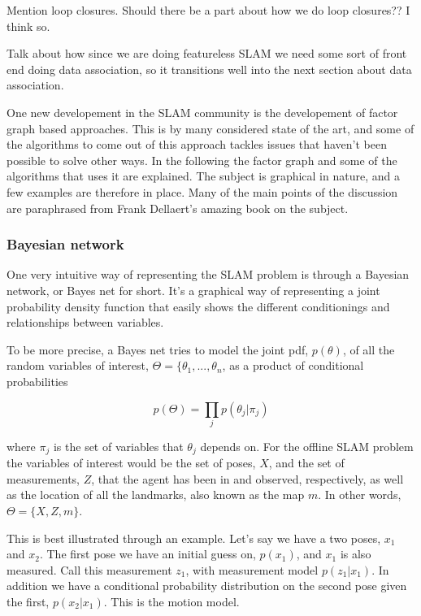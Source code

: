 Mention loop closures. Should there be a part about how we do loop closures?? I think so. 

Talk about how since we are doing featureless SLAM we need some sort of front end doing data association, so it transitions well into the next section about data association.

One new developement in the SLAM community is the developement of factor graph based approaches. This is by many considered state of the art, and some of the algorithms to come out of this approach tackles issues that haven't been possible to solve other ways. In the following the factor graph and some of the algorithms that uses it are explained. The subject is graphical in nature, and a few examples are therefore in place. Many of the main points of the discussion are paraphrased from Frank Dellaert's amazing book on the subject\cite{Dellaert}. 

\subsubsection{Bayesian network}

One very intuitive way of representing the SLAM problem is through a Bayesian network, or Bayes net for short. It's a graphical way of representing a joint probability density function that easily shows the different conditionings and relationships between variables. 

To be more precise, a Bayes net tries to model the joint pdf, $p(\theta)$, of all the random variables of interest, $\Theta = \{\theta_1, ..., \theta_n$, as a product of conditional probabilities

\begin{equation}
    p(\Theta) = \prod_j p(\theta_j|\pi_j)
\end{equation}

where $\pi_j$ is the set of variables that $\theta_j$ depends on. For the offline SLAM problem the variables of interest would be the set of poses, $X$, and the set of measurements, $Z$, that the agent has been in and observed, respectively, as well as the location of all the landmarks, also known as the map $m$. In other words, $\Theta = \{X,Z,m\}$. 

This is best illustrated through an example. Let's say we have a two poses, $x_1$ and $x_2$. The first pose we have an initial guess on, $p(x_1)$, and $x_1$ is also measured. Call this measurement $z_1$, with measurement model $p(z_1|x_1)$. In addition we have a conditional probability distribution on the second pose given the first, $p(x_2|x_1)$. This is the motion model. 

